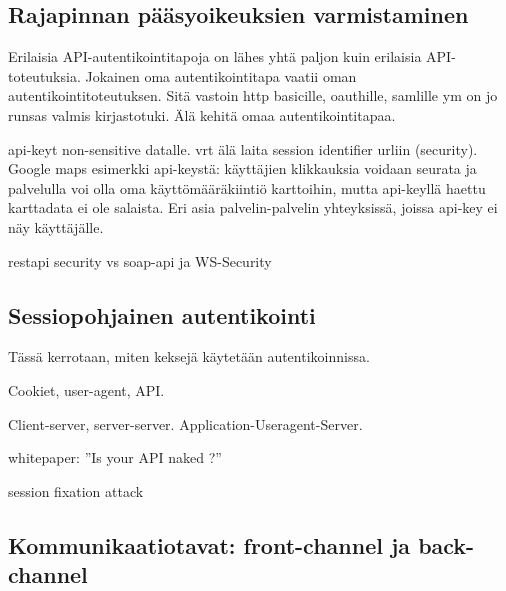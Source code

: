 \documentclass[finnish,gradu]{tktltiki}
\begin{document}



  \subsection{Rajapinnan pääsyoikeuksien varmistaminen} %
  \label{sub:rajapintakutsun_pääsyoikeudet}
  Erilaisia API-autentikointitapoja on lähes yhtä paljon kuin erilaisia API-toteutuksia. Jokainen oma autentikointitapa vaatii oman autentikointitoteutuksen. Sitä vastoin http basicille, oauthille, samlille ym on jo runsas valmis kirjastotuki.  Älä kehitä omaa autentikointitapaa.

  api-keyt non-sensitive datalle. vrt älä laita session identifier urliin (security). Google maps esimerkki api-keystä: käyttäjien klikkauksia voidaan seurata ja palvelulla voi olla oma käyttömääräkiintiö karttoihin, mutta api-keyllä haettu karttadata ei ole salaista. Eri asia palvelin-palvelin yhteyksissä, joissa api-key ei näy käyttäjälle.

  restapi security vs soap-api ja WS-Security


  \subsection{Sessiopohjainen autentikointi} %
  \label{sub:sessiopohjainen_autentikointi}
  Tässä kerrotaan, miten keksejä käytetään autentikoinnissa.

  Cookiet, user-agent, API.

  Client-server, server-server. Application-Useragent-Server.

  whitepaper: ''Is your API naked ?''

  session fixation attack %



  \subsection{Kommunikaatiotavat: front-channel ja back-channel} %
  \label{sub:kommunikaatiotavat_front_channel_ja_back_channel}
\end{document}
